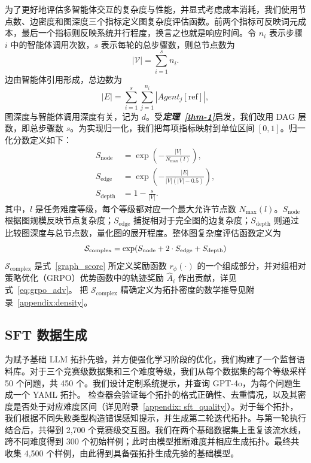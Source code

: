\documentclass{article}
\theoremstyle{definition}
\begin{document}
为了更好地评估多智能体交互的复杂度与性能，并显式考虑成本消耗，我们使用节点数、边密度和图深度三个指标定义图复杂度评估函数。前两个指标可反映词元成本，最后一个指标则反映系统并行程度，换言之也就是响应时间。令 $n_i$ 表示步骤 $i$ 中的智能体调用次数，$s$ 表示每轮的总步骤数，则总节点数为
\begin{equation}\label{eq:num_of_nodes}
|\mathcal{V}| = \sum_{i=1}^{s} n_i.
\end{equation}
边由智能体引用形成，总边数为
\begin{equation}\label{eq:num_of_edges}
|E| = \sum_{i=1}^{s} \sum_{j=1}^{n_i} |Agent_j[\text{ref}]|,
\end{equation} 图深度与智能体调用深度有关，记为 $d$。受\textbf{\textit{定理~\ref{thm-1}}}启发，我们改用 DAG 层数，即总步骤数 $s$。为实现归一化，我们把每项指标映射到单位区间 $[0,1]$。归一化分数定义如下：
\begin{equation}
\begin{aligned}
S_{\text{node}}
&= \exp\!\left(-\tfrac{|V|}{N_{\max}(l)}\right), \\
S_{\text{edge}}
&= \exp\!\left(-\tfrac{|E|}{|V|(|V|-0.5)}\right), \\
S_{\text{depth}}
&= 1 - \tfrac{s}{|V|}.
\end{aligned}
\end{equation}
其中，\(l\) 是任务难度等级，每个等级都对应一个最大允许节点数 $N_{\max}(l)$。$S_{\text{node}}$ 根据图规模反映节点复杂度；$S_{\text{edge}}$ 捕捉相对于完全图的边复杂度；$S_{\text{depth}}$ 则通过比较图深度与总节点数，量化图的展开程度。整体图复杂度评估函数定义为
\begin{equation}
\label{eq:graph_complexity}
\scalebox{0.95}{$
\mathcal{S}_{\text{complex}}
=  \exp\!\left(
 S_{\text{node}}
+ 2 \cdot S_{\text{edge}}
+ S_{\text{depth}}
\right)
$}
\end{equation}
$\mathcal{S}_{\text{complex}}$ 是式~\ref{graph_score} 所定义奖励函数 $r_{\phi}(\cdot)$ 的一个组成部分，并对组相对策略优化（GRPO）优势函数中的轨迹奖励 $\hat{A}_i$ 作出贡献，详见式~\ref{eq:grpo_adv}。
把 $\mathcal{S}_{\text{complex}}$ 精确定义为拓扑密度的数学推导见附录~\ref{appendix:density}。


\subsection{SFT 数据生成}
\label{graph:sft}
为赋予基础 LLM 拓扑先验，并方便强化学习阶段的优化，我们构建了一个监督语料库。对于三个竞赛级数据集和三个难度等级，我们从每个数据集的每个等级采样 50 个问题，共 450 个。我们设计定制系统提示，并查询 GPT-4o，为每个问题生成一个 YAML 拓扑。
检查器会验证每个拓扑的格式正确性、去重情况，以及其密度是否处于对应难度区间（详见附录~\ref{appendix: sft_quality}）。对于每个拓扑，我们根据不同失败类型构造错误感知提示，并生成第二轮迭代拓扑。与第一轮执行结合后，共得到 2,700 个竞赛级交互图。我们在两个基础数据集上重复该流水线，跨不同难度得到 300 个初始样例；此时由模型推断难度并相应生成拓扑。最终共收集 4,500 个样例，由此得到具备强拓扑生成先验的基础模型。
\end{document}

